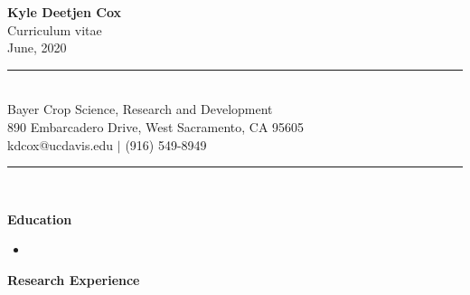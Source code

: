 \documentclass[letterpaper,12pt]{article}
\begin{document}
\begin{center}
\fontsize{16}{19.2}
\textbf{Kyle Deetjen Cox}\\
\fontsize{12}{14.4}
Curriculum vitae\\
June, 2020\\
\noindent\rule{\linewidth}{0.4pt}\\
Bayer Crop Science, Research and Development\\
890 Embarcadero Drive, West Sacramento, CA 95605\\
kdcox@ucdavis.edu $\vert$ (916) 549-8949\\
\noindent\rule{\linewidth}{0.4pt}\\
\end{center}
\textbf{Education}
\begin{itemize}
\item[]
\end{itemize}
\vspace*{1\baselineskip}
\textbf{Research Experience}
\end{document}
